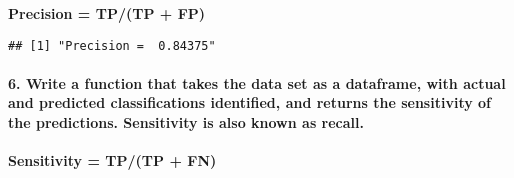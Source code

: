 \documentclass[]{article}
\newenvironment{Shaded}{\begin{snugshade}}{\end{snugshade}}
\newcommand{\ControlFlowTok}[1]{\textcolor[rgb]{0.13,0.29,0.53}{\textbf{#1}}}
\newcommand{\KeywordTok}[1]{\textcolor[rgb]{0.13,0.29,0.53}{\textbf{#1}}}
\newcommand{\NormalTok}[1]{#1}
\newcommand{\OperatorTok}[1]{\textcolor[rgb]{0.81,0.36,0.00}{\textbf{#1}}}
\newcommand{\StringTok}[1]{\textcolor[rgb]{0.31,0.60,0.02}{#1}}
\let\oldparagraph\paragraph
\renewcommand{\paragraph}[1]{\oldparagraph{#1}\mbox{}}
\begin{document}
\textbf{Precision = TP/(TP + FP)}

\begin{Shaded}
\end{Shaded}

\begin{verbatim}
## [1] "Precision =  0.84375"
\end{verbatim}

\hypertarget{write-a-function-that-takes-the-data-set-as-a-dataframe-with-actual-and-predicted-classifications-identified-and-returns-the-sensitivity-of-the-predictions.-sensitivity-is-also-known-as-recall.}{%
\paragraph{6. Write a function that takes the data set as a dataframe,
with actual and predicted classifications identified, and returns the
sensitivity of the predictions. Sensitivity is also known as
recall.}\label{write-a-function-that-takes-the-data-set-as-a-dataframe-with-actual-and-predicted-classifications-identified-and-returns-the-sensitivity-of-the-predictions.-sensitivity-is-also-known-as-recall.}}

\textbf{Sensitivity = TP/(TP + FN)}

\begin{Shaded}
\end{Shaded}
\end{document}
